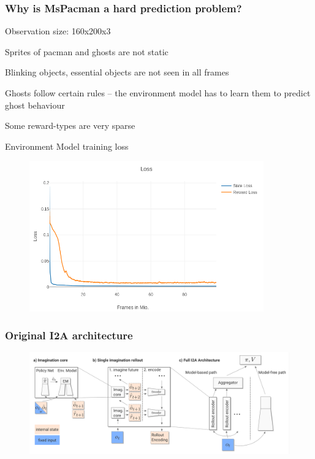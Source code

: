 \begin{frame}
	\frametitle{Why is MsPacman a hard prediction problem?}
	\begin{PraesentationAufzaehlung}
		\item Observation size: 160x200x3
		\item Sprites of pacman and ghosts are not static
		\item Blinking objects, essential objects are not seen in all frames
		\item Ghosts follow certain rules -- the environment model has to learn them to predict ghost behaviour
		\item Some reward-types are very sparse
	\end{PraesentationAufzaehlung}
\end{frame}

    
\begin{frame}{Environment Model training loss}
	\vspace{-10mm}
   	\begin{figure}
       \centering
        \includegraphics[width=0.9\textwidth]{./latent_i2a_images/EnvironmentModel_dSSM-DET_training.png}
    \end{figure}
\end{frame}





\begin{frame}
	\frametitle{Original I2A architecture}
	\begin{figure}
        \centering
        \includegraphics[width=\textwidth]{./latent_i2a_images/i2a_architecture.png}
    \end{figure}
\end{frame}

